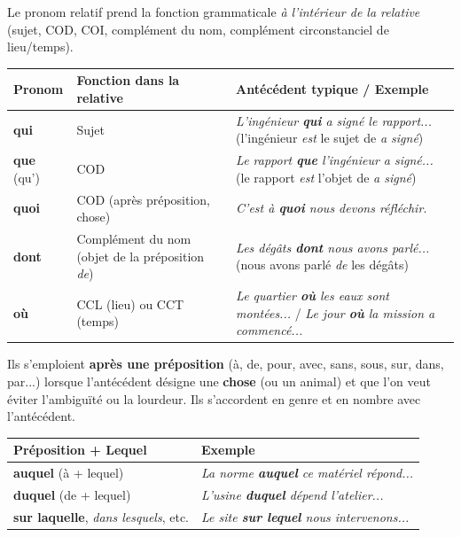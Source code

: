 \documentclass[11pt]{article}
\begin{document}
\begin{propriete}
Le pronom relatif prend la fonction grammaticale \emph{à l'intérieur de la relative} (sujet, COD, COI, complément du nom, complément circonstanciel de lieu/temps).
\begin{center}
\begin{tabularx}{\linewidth}{|l|X|X|}\hline
\textbf{Pronom} & \textbf{Fonction dans la relative} & \textbf{Antécédent typique / Exemple} \\ \hline
\textbf{qui} & Sujet & \emph{L'ingénieur \textbf{qui} a signé le rapport...} (l'ingénieur \emph{est} le sujet de \emph{a signé}) \\ \hline
\textbf{que} (qu') & COD & \emph{Le rapport \textbf{que} l'ingénieur a signé...} (le rapport \emph{est} l'objet de \emph{a signé}) \\ \hline
\textbf{quoi} & COD (après préposition, chose) & \emph{C'est à \textbf{quoi} nous devons réfléchir.} \\ \hline
\textbf{dont} & Complément du nom (objet de la préposition \emph{de}) & \emph{Les dégâts \textbf{dont} nous avons parlé...} (nous avons parlé \emph{de} les dégâts) \\ \hline
\textbf{où} & CCL (lieu) ou CCT (temps) & \emph{Le quartier \textbf{où} les eaux sont montées...} / \emph{Le jour \textbf{où} la mission a commencé...} \\ \hline
\end{tabularx}
\end{center}
\end{propriete}

\begin{propriete}
Ils s'emploient \textbf{après une préposition} (à, de, pour, avec, sans, sous, sur, dans, par...) lorsque l'antécédent désigne une \textbf{chose} (ou un animal) et que l'on veut éviter l'ambiguïté ou la lourdeur. Ils s'accordent en genre et en nombre avec l'antécédent.
\begin{center}
\begin{tabularx}{\linewidth}{|l|X|}\hline
\textbf{Préposition + Lequel} & \textbf{Exemple} \\ \hline
\textbf{auquel} (à + lequel) & \emph{La norme \textbf{auquel} ce matériel répond...} \\ \hline
\textbf{duquel} (de + lequel) & \emph{L'usine \textbf{duquel} dépend l'atelier...} \\ \hline
\textbf{sur laquelle}, \emph{dans lesquels}, etc. & \emph{Le site \textbf{sur lequel} nous intervenons...} \\ \hline
\end{tabularx}
\end{center}
\end{propriete}
\end{document}
